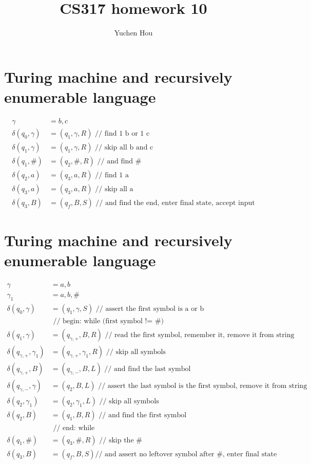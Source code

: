 \documentclass{article}
\begin{document}
\lstset{language=Java}
\title{CS317 homework 10}
\author{Yuchen Hou}
\maketitle

\section{Turing machine and recursively enumerable language}
\begin{align*}
\gamma &= b, c\\
\delta(q_0, \gamma) &= (q_1, \gamma, R) \text{ // find 1 b or
1 c}\\
\delta(q_1, \gamma) &= (q_1, \gamma, R) \text{ // skip all b and
c}\\
\delta(q_1, \#) &= (q_2, \#, R) \text{ // and find \#}\\
\delta(q_2, a) &= (q_3, a, R) \text{ // find 1 a}\\
\delta(q_3, a) &= (q_3, a, R) \text{ // skip all a}\\
\delta(q_3, B) &= (q_f, B, S) \text{ // and find the end, enter final state,
accept input}
\end{align*}

\section{Turing machine and recursively enumerable language}
\begin{align*}
\gamma &= a, b\\
\gamma_1 &= a, b, \#\\
\delta(q_0, \gamma) &= (q_1, \gamma, S) \text{ // assert the first symbol is a
or b}\\
&\text{ // begin: while (first symbol != \#)}\\
\delta(q_1, \gamma) &= (q_{\gamma,+}, B, R) \text{ // read the first symbol,
remember it, remove it from string}\\
\delta(q_{\gamma,+}, \gamma_1) &= (q_{\gamma,+}, \gamma_1, R) \text{ // skip all
symbols}\\
\delta(q_{\gamma,+}, B) &= (q_{\gamma,-}, B, L) \text{ // and find the last
symbol}\\
\delta(q_{\gamma,-}, \gamma) &= (q_2, B, L) \text{ // assert the last symbol is
the first symbol, remove it from string}\\
\delta(q_2, \gamma_1) &= (q_2, \gamma_1, L) \text{ // skip all symbols}\\
\delta(q_2, B) &= (q_1, B, R) \text{ // and find the first symbol}\\
&\text{ // end: while}\\
\delta(q_1, \#) &= (q_3, \#, R) \text{ // skip the \#}\\
\delta(q_3, B) &= (q_f, B, S) \text{// and assert no leftover symbol after \#,
enter final state}
\end{align*}
\end{document}
